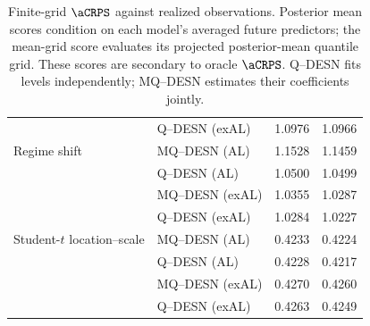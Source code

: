\begin{table}[p]
\begin{tabular}{@{}>{\raggedright\arraybackslash}p{}>{\raggedright\arraybackslash}p{}rr@{}}
 & Q--DESN (exAL) & 1.0976 & 1.0966 \\
\addlinespace[2pt]
Regime shift & MQ--DESN (AL) & 1.1528 & 1.1459 \\
 & Q--DESN (AL) & 1.0500 & 1.0499 \\
 & MQ--DESN (exAL) & 1.0355 & 1.0287 \\
 & Q--DESN (exAL) & 1.0284 & 1.0227 \\
\addlinespace[2pt]
Student-\(t\) location--scale & MQ--DESN (AL) & 0.4233 & 0.4224 \\
 & Q--DESN (AL) & 0.4228 & 0.4217 \\
 & MQ--DESN (exAL) & 0.4270 & 0.4260 \\
 & Q--DESN (exAL) & 0.4263 & 0.4249 \\
\bottomrule
\end{tabular}
\caption{Finite-grid \(\aCRPS\) against realized observations. Posterior mean scores condition on each model's averaged future predictors; the mean-grid score evaluates its projected posterior-mean quantile grid. These scores are secondary to oracle \(\aCRPS\). Q--DESN fits levels independently; MQ--DESN estimates their coefficients jointly.}
\label{tab:joint-qdesn-pure-desn-v2-secondary}
\end{table}
